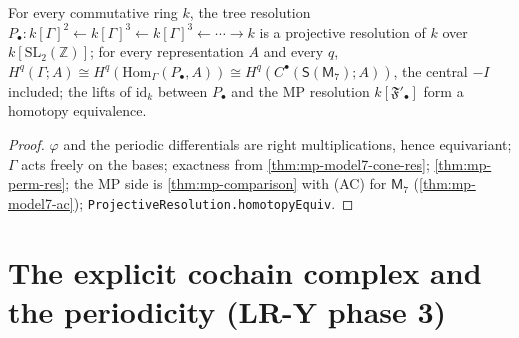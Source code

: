 \begin{theorem}\label{thm:mp-tree-mp-comparison}
  \leanok
  For every commutative ring $k$, the tree resolution $P_\bullet\colon k[\Gamma]^2\leftarrow k[\Gamma]^3\leftarrow k[\Gamma]^3\leftarrow\cdots\to k$
  is a projective resolution of $k$ over $k[\mathrm{SL}_2(\mathbb Z)]$; for every representation $A$ and every $q$,
  $H^q(\Gamma;A)\cong H^q(\mathrm{Hom}_\Gamma(P_\bullet,A))\cong H^q(C^\bullet(\mathsf S(\mathsf M_7);A))$, the central $-I$ included;
  the lifts of $\mathrm{id}_k$ between $P_\bullet$ and the MP resolution $k[\mathfrak F'_\bullet]$ form a homotopy equivalence.
\end{theorem}
\begin{proof}
  \leanok
  $\varphi$ and the periodic differentials are right multiplications, hence equivariant; $\Gamma$ acts freely on the bases;
  exactness from \ref{thm:mp-model7-cone-res}; \ref{thm:mp-perm-res}; the MP side is \ref{thm:mp-comparison} with (AC) for
  $\mathsf M_7$ (\ref{thm:mp-model7-ac}); \texttt{ProjectiveResolution.homotopyEquiv}.
\end{proof}

\section{The explicit cochain complex and the periodicity (LR-Y phase 3)}

